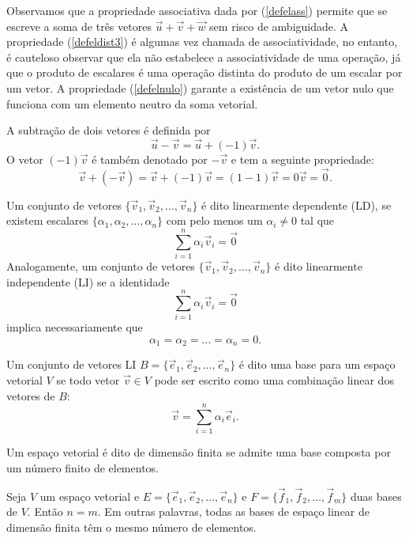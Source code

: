 \begin{obs}Observamos que a propriedade associativa dada por (\ref{defelass}) permite que se escreve a soma de três vetores $\vec{u}+\vec{v}+\vec{w}$ sem risco de ambiguidade. A propriedade (\ref{defeldist3}) é algumas vez chamada de associatividade, no entanto, é cauteloso observar que ela não estabelece a associatividade de uma operação, já que o produto de escalares é uma operação distinta do produto de um escalar por um vetor. A propriedade (\ref{defelnulo}) garante a existência de um vetor nulo que funciona com um elemento neutro da soma vetorial. \end{obs}

A subtração de dois vetores é definida por
\begin{equation}\label{delsub}
\vec{u}-\vec{v}=\vec{u}+ (-1) \vec{v}.
\end{equation}
O vetor $(-1) \vec{v}$ é também denotado por $-\vec{v}$ e tem a seguinte propriedade:
\begin{equation}\label{delinvad}
\vec{v}+(-\vec{v})=\vec{v}+(-1) \vec{v} = (1-1)\vec{v}=0\vec{v}=\vec{0}.
\end{equation}

Um conjunto de vetores $\{\vec{v}_1, \vec{v}_2,\ldots, \vec{v}_n\}$ é dito linearmente dependente (LD), se existem escalares $\{\alpha_1,\alpha_2,\ldots, \alpha_n\}$ com pelo menos um $\alpha_i\neq 0$ tal que
$$\sum_{i=1}^n\alpha_i \vec{v}_i=\vec{0}$$ 
Analogamente, um conjunto de vetores $\{\vec{v}_1, \vec{v}_2,\ldots, \vec{v}_n\}$ é dito linearmente independente (LI) se a identidade 
$$\sum_{i=1}^n\alpha_i \vec{v}_i=\vec{0}$$ 
implica necessariamente que
$$\alpha_1=\alpha_2=\ldots=\alpha_n=0.$$

Um conjunto de vetores LI $B=\{\vec{e}_1, \vec{e}_2,\ldots, \vec{e}_n\}$ é dito uma base para um espaço vetorial $V$ se todo vetor $\vec{v}\in V$ pode ser escrito como uma combinação linear dos vetores de $B$:
$$\vec{v}=\sum_{i=1}^n \alpha_i \vec{e}_i.$$ 

Um espaço vetorial é dito de dimensão finita se admite uma base composta por um número finito de elementos.

\begin{teo}\label{teo_dim} Seja $V$ um espaço vetorial e $E=\{\vec{e}_1, \vec{e}_2,\ldots, \vec{e}_n\}$ e $F=\{\vec{f}_1, \vec{f}_2,\ldots, \vec{f}_m\}$ duas bases de $V$. Então $n=m$. Em outras palavras, todas as bases de espaço linear de dimensão finita têm o mesmo número de elementos.
 \end{teo}

